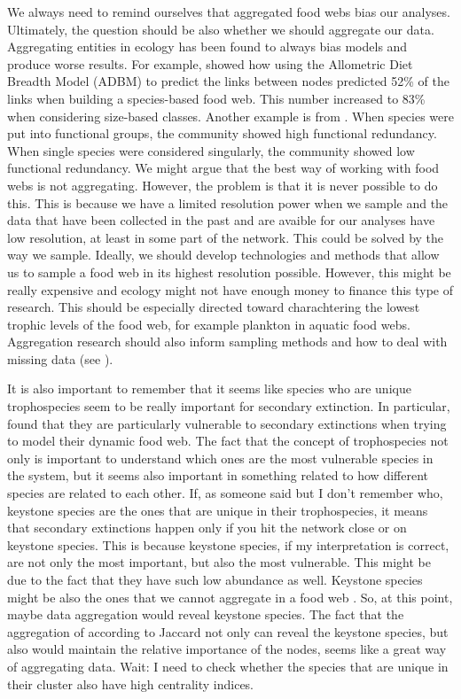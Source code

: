 \documentclass[twocolumn]{article}
\begin{document}
	We always need to remind ourselves that aggregated food webs bias our analyses.
	Ultimately, the question should be also whether we should aggregate our data.
	Aggregating entities in ecology has been found to always bias models and produce worse results.
	For example, \citet{Woodward2010b} showed how using the Allometric Diet Breadth Model (ADBM) \citep{Petchey2008} to predict the links between nodes predicted 52\% of the links when building a species-based food web.
	This number increased to 83\% when considering size-based classes.
	Another example is from \citet{Petchey2002}.
	When species were put into functional groups, the community showed high functional redundancy.
	When single species were considered singularly, the community showed low functional redundancy.
	We might argue that the best way of working with food webs is not aggregating. However, the problem is that it is never possible to do this.
	This is because we have a limited resolution power when we sample and the data that have been collected in the past and are avaible for our analyses have low resolution, at least in some part of the network.
	This could be solved by the way we sample.
	Ideally, we should develop technologies and methods that allow us to sample a food web in its highest resolution possible.
	However, this might be really expensive and ecology might not have enough money to finance this type of research.
	This should be especially directed toward charachtering the lowest trophic levels of the food web, for example plankton in aquatic food webs.
	Aggregation research should also inform sampling methods and how to deal with missing data (see \citet{Patonai2017}).

	It is also important to remember that it seems like species who are unique trophospecies seem to be really important for secondary extinction. In particular, \citep{Petchey2008a} found that they are particularly vulnerable to secondary extinctions when trying to model their dynamic food web. The fact that the concept of trophospecies not only is important to understand which ones are the most vulnerable species in the system, but it seems also important in something related to how different species are related to each other. If, as someone said but I don't remember who, keystone species are the ones that are unique in their trophospecies, it means that secondary extinctions happen only if you hit the network close or on keystone species. This is because keystone species, if my interpretation is correct, are not only the most important, but also the most vulnerable. This might be due to the fact that they have such low abundance as well.
	Keystone species might be also the ones that we cannot aggregate in a food web \citep{Bond1994}. So, at this point, maybe data aggregation would reveal keystone species. The fact that the aggregation of according to Jaccard not only can reveal the keystone species, but also would maintain the relative importance of the nodes, seems like a great way of aggregating data. Wait: I need to check whether the species that are unique in their cluster also have high centrality indices.
\end{document}
